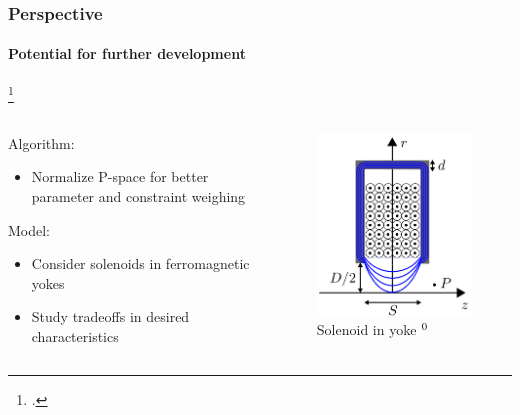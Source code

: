 \documentclass[10pt]{beamer}
\newcommand{\citesame}{$^{\thefootnote}$}
\newcommand{\rfn}{\setcounter{footnote}{0}}
\begin{document}
\begin{frame}
\begin{frame}
  \frametitle{Perspective}
  \framesubtitle{Potential for further development}
  \rfn
  \vspace{-10cm}
  \footcite{Disser}
  \vspace{10cm}
  \begin{columns}
    \begin{column}{0.7\textwidth}
      Algorithm:
      \begin{itemize}
        \item Normalize P-space for better parameter and constraint weighing
      \end{itemize}
      \vspace{0.5cm}
      Model:
      \begin{itemize}
        \item Consider solenoids in ferromagnetic yokes
        \vspace{0.5cm}
        \item Study tradeoffs in desired characteristics
      \end{itemize}
    \end{column}
    \begin{column}{0.3\textwidth}
        \begin{figure}
          \includegraphics[width=\textwidth]{yoke}
          \caption{Solenoid in yoke \citesame}
        \end{figure}
    \end{column}
  \end{columns}



\end{frame}
\end{frame}
\end{document}
